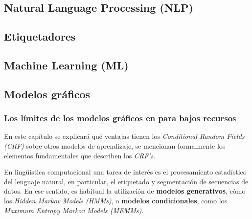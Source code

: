 \documentclass[letterpaper,12pt,oneside]{scrbook}
\theoremstyle{definition}
\begin{document}




	

	\subsection{Natural Language Processing (NLP)}


	
	\subsection{Etiquetadores}

	

	\subsection{Machine Learning (ML)}

	
	\subsection{Modelos gráficos}

	

	


	
	\subsubsection{Los límites de los modelos gráficos en para bajos recursos}

	
	En este capítulo se explicará qué ventajas tienen los \emph{Conditional Random Fields (CRF)} sobre otros modelos de aprendizaje, se mencionan formalmente los elementos fundamentales que describen los \emph{CRF's}.

	
	En lingüística computacional una tarea de interés es el procesamiento estadístico del lenguaje natural, en particular, el etiquetado y segmentación de secuencias de datos. En ese sentido, es habitual la utilización de \textbf{modelos generativos}, cómo los \textit{Hidden Markov Models (HMMs)}, o \textbf{modelos condicionales}, como los \textit{Maximum Entropy Markov Models (MEMMs)}.
\end{document}
